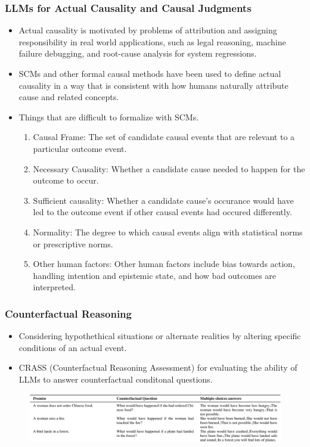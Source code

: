 \documentclass{beamer}
\begin{document}
\begin{frame}
	\frametitle{LLMs for Actual Causality and Causal Judgments}
	\begin{itemize}
		\item Actual causality is motivated by problems of attribution and assigning responsibility in real world applications, such as legal reasoning,
			machine failure debugging, and root-cause analysis for system regressions.
		\item SCMs and other formal causal methods have been used to define actual causality in a way that is consistent with how humans 
			naturally attribute cause and related concepts.
		\item Things that are difficult to formalize with SCMs.
		\begin{enumerate}
			\item Causal Frame: The set of candidate causal events that are relevant to a particular outcome event.
			\item Necessary Causality: Whether a candidate cause needed to happen for the outcome to occur.
			\item Sufficient causality: Whether a candidate cause's occurance would have led to the outcome event if other causal events had 
				occured differently.
			\item Normality: The degree to which causal events align with statistical norms or prescriptive norms.
			\item Other human factors: Other human factors include bias towards action, handling intention and epistemic state, and how
				bad outcomes are interpreted.
		\end{enumerate}
	\end{itemize}
\end{frame}

\begin{frame}
	\frametitle{Counterfactual Reasoning}
	\begin{itemize}
		\item Considering hypothethical situations or alternate realities by altering specific conditions of an actual event.
		\item CRASS (Counterfactual Reasoning Assessment) for evaluating the ability of LLMs to answer counterfactual conditonal questions.
	\end{itemize}
	\begin{figure}
		\centering
		\includegraphics[scale=0.2]{imgs/table8.png}
	\end{figure}
\end{frame}
\end{document}
